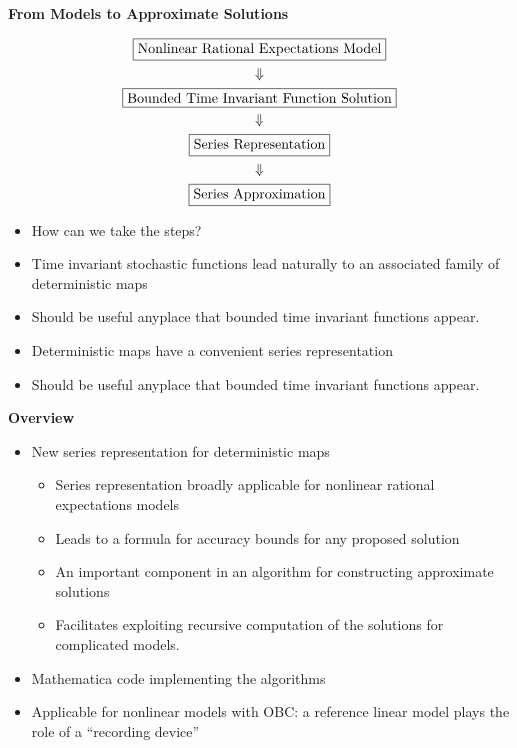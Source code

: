\documentclass[12pt]{article}
\begin{document}
{\bf From Models to Approximate Solutions }

  \begin{gather}
    \fbox{Nonlinear Rational Expectations Model}\\ \Downarrow\\
\fbox{Bounded Time Invariant Function Solution}\\\Downarrow\\
\fbox{Series Representation}\\\Downarrow\\
\fbox{Series Approximation}
  \end{gather}
  \begin{itemize}
  \item  How can we take the  steps?
  \item Time invariant stochastic functions 
lead naturally to an associated family of deterministic maps

\item Should be useful anyplace that bounded time invariant functions appear.

\item Deterministic maps have a convenient series representation
\item Should be useful anyplace that bounded time invariant functions appear.
  \end{itemize}


 {\bf Overview}

  \begin{itemize}
\item New series representation for deterministic maps
  \begin{itemize}
\item Series representation broadly applicable for nonlinear rational expectations models 
\item Leads to a formula for accuracy bounds for any proposed solution
\item An important component in an algorithm for constructing approximate solutions 
\item Facilitates exploiting recursive computation of the solutions for complicated models.
  \end{itemize}
\item Mathematica code implementing the algorithms
\item Applicable for nonlinear models with OBC: a reference linear model plays the role of a ``recording device''
  \end{itemize}
\end{document}
